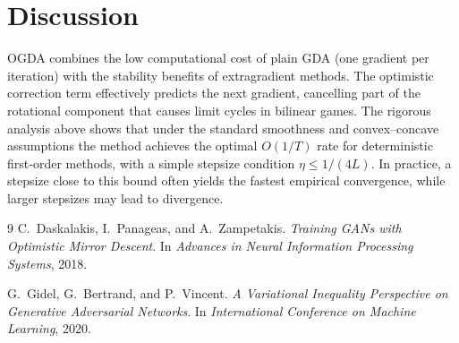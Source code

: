 \documentclass{article}
\begin{document}
\section*{Discussion}
OGDA combines the low computational cost of plain GDA (one gradient per iteration) with the stability benefits of extragradient methods.  The optimistic correction term effectively predicts the next gradient, cancelling part of the rotational component that causes limit cycles in bilinear games.  The rigorous analysis above shows that under the standard smoothness and convex–concave assumptions the method achieves the optimal \(O(1/T)\) rate for deterministic first‑order methods, with a simple stepsize condition \(\eta\le 1/(4L)\).  In practice, a stepsize close to this bound often yields the fastest empirical convergence, while larger stepsizes may lead to divergence.

\begin{thebibliography}{9}
C.~Daskalakis, I.~Panageas, and A.~Zampetakis. \emph{Training GANs with Optimistic Mirror Descent}. In \textit{Advances in Neural Information Processing Systems}, 2018.

G.~Gidel, G.~Bertrand, and P.~Vincent. \emph{A Variational Inequality Perspective on Generative Adversarial Networks}. In \textit{International Conference on Machine Learning}, 2020.

\end{thebibliography}
\end{document}
